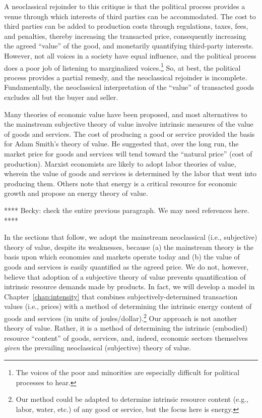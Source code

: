 A neoclassical rejoinder to this critique is that 
the political process provides a venue through which 
interests of third parties can be accommodated.
The cost to third parties can be added to production 
costs through regulations, taxes, fees, and penalties, 
thereby increasing the transacted price, 
consequently increasing the agreed ``value'' of the good,
and monetarily quantifying third-party interests.
However, not all voices in a society have equal influence,
and the political process does a poor job of listening to 
marginalized voices.\footnote{The voices
of the poor and minorities are especially difficult for 
political processes to hear.}
So, at best, the political process provides a partial remedy,
and the neoclassical rejoinder is incomplete.
Fundamentally, the neoclassical interpretation of the ``value''
of transacted goods excludes all but the buyer and seller.

Many theories of economic value have been proposed, 
and most alternatives to the mainstream subjective 
theory of value involve 
intrinsic measures of the value of goods and services.
The cost of producing a good or service provided the basis for
Adam Smith's theory of value. 
He suggested that, over the long run,
the market price for goods and services will tend toward
the ``natural price'' (cost of production).
Marxist economists are likely to adopt labor theories of value, 
wherein the value of goods and services is 
determined by the labor that went into producing them.
Others note that energy is a critical resource for economic growth
and propose an energy theory of value.

**** Becky: check the entire previous paragraph. We may need references here. ****

In the sections that follow, we adopt the mainstream neoclassical
(i.e., subjective) theory of value, despite its weaknesses, 
because (a) the mainstream theory is 
the basis upon which economies and markets operate today
and (b) the value of goods and services is easily quantified
as the agreed price. 
We do not, however, believe that adoption of a subjective
theory of value prevents quantification of intrinsic resource demands
made by products.
In fact, we will develop a model in Chapter~\ref{chap:intensity} 
that combines subjectively-determined transaction values
(i.e., prices) with a method of determining the intrinsic energy content
of goods and services (in units of joules/dollar).\footnote{Our
method could be adapted to determine intrinsic resource content 
(e.g., labor, water, etc.) 
of any good or service, but the focus here is energy.}
Our approach is not another theory of value. 
Rather, it is a method of determining the intrinsic (embodied) 
resource ``content'' of goods, services, and, indeed, economic sectors themselves
\emph{given} the prevailing neoclassical (subjective) theory of value.

